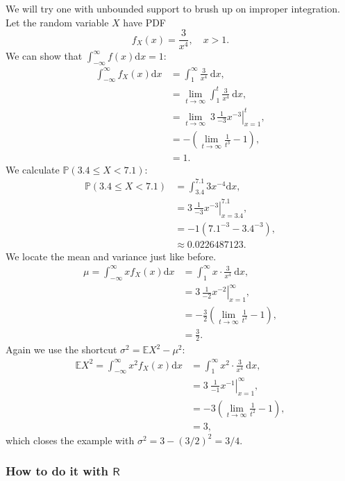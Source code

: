 \label{exa-cont-pdf-3x4} We will try one with unbounded support to brush
up on improper integration. Let the random variable \(X\) have PDF \[
f_{X}(x)=\frac{3}{x^{4}},\quad x>1.  \] We can show that
\(\int_{-\infty}^{\infty}f(x)\mathrm{d} x=1\):
\begin{align*}
\int_{-\infty}^{\infty}f_{X}(x)\mathrm{d} x & =\int_{1}^{\infty}\frac{3}{x^{4}}\:\mathrm{d} x,\\
 & =\lim_{t\to\infty}\int_{1}^{t}\frac{3}{x^{4}}\:\mathrm{d} x,\\
 & =\lim_{t\to\infty}\ \left.3\,\frac{1}{-3}x^{-3}\right|_{x=1}^{t},\\
 & =-\left(\lim_{t\to\infty}\frac{1}{t^{3}}-1\right),\\
 & =1.
\end{align*}
We calculate \(\mathbb{P}(3.4\leq X<7.1)\):
\begin{align*}
\mathbb{P}(3.4\leq X<7.1) & =\int_{3.4}^{7.1}3x^{-4}\mathrm{d} x,\\
 & =\left.3\,\frac{1}{-3}x^{-3}\right|_{x=3.4}^{7.1},\\
 & =-1(7.1^{-3}-3.4^{-3}),\\
 & \approx0.0226487123.
\end{align*}
We locate the mean and variance just like before.
\begin{align*}
\mu=\int_{-\infty}^{\infty}xf_{X}(x)\mathrm{d} x & =\int_{1}^{\infty}x\cdot\frac{3}{x^{4}}\:\mathrm{d} x,\\
 & =\left.3\,\frac{1}{-2}x^{-2}\right|_{x=1}^{\infty},\\
 & =-\frac{3}{2}\left(\lim_{t\to\infty}\frac{1}{t^{2}}-1\right),\\
 & =\frac{3}{2}.
\end{align*}
Again we use the shortcut \(\sigma^{2}=\mathbb{E} X^{2}-\mu^{2}\):
\begin{align*}
\mathbb{E} X^{2}=\int_{-\infty}^{\infty}x^{2}f_{X}(x)\mathrm{d} x & =\int_{1}^{\infty}x^{2}\cdot\frac{3}{x^{4}}\:\mathrm{d} x,\\
 & =\left.3\:\frac{1}{-1}x^{-1}\right|_{x=1}^{\infty},\\
 & =-3\left(\lim_{t\to\infty}\frac{1}{t^{2}}-1\right),\\
 & =3,
\end{align*}
which closes the example with \(\sigma^{2}=3-(3/2)^{2}=3/4\).

\subsubsection{How to do it with \(\mathsf{R}\)}
\label{sec-6-1-2-1}

